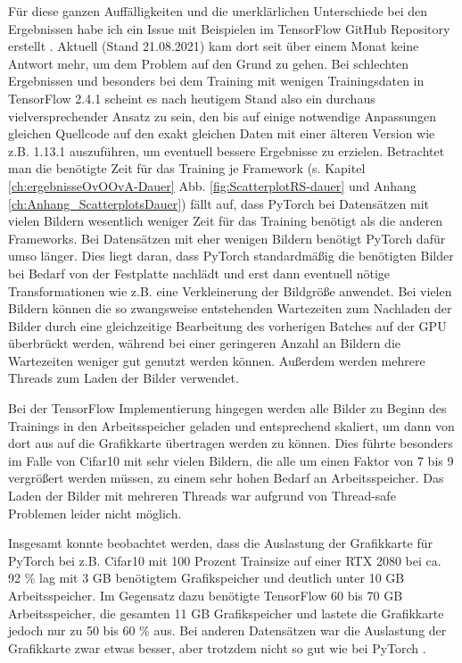 Für diese ganzen Auffälligkeiten und die unerklärlichen Unterschiede bei den Ergebnissen habe ich ein Issue mit Beispielen im TensorFlow GitHub Repository erstellt \cite{githubTFIssue}. Aktuell (Stand 21.08.2021) kam dort seit über einem Monat keine Antwort mehr, um dem Problem auf den Grund zu gehen.
Bei schlechten Ergebnissen und besonders bei dem Training mit wenigen Trainingsdaten in TensorFlow 2.4.1 \cite{tensorflow} scheint es nach heutigem Stand also ein durchaus vielversprechender Ansatz zu sein, den bis auf einige notwendige Anpassungen gleichen Quellcode auf den exakt gleichen Daten mit einer älteren Version wie z.B. 1.13.1 auszuführen, um eventuell bessere Ergebnisse zu erzielen.
\newpage
Betrachtet man die benötigte Zeit für das Training je Framework (s. Kapitel \ref{ch:ergebnisseOvOOvA-Dauer} Abb. \ref{fig:ScatterplotRS-dauer} und Anhang \ref{ch:Anhang_ScatterplotsDauer}) fällt auf, dass PyTorch \cite{pytorch} bei Datensätzen mit vielen Bildern wesentlich weniger Zeit für das Training benötigt als die anderen Frameworks. Bei Datensätzen mit eher wenigen Bildern benötigt PyTorch \cite{pytorch} dafür umso länger. Dies liegt daran, dass PyTorch \cite{pytorch} standardmäßig die benötigten Bilder bei Bedarf von der Festplatte nachlädt und erst dann eventuell nötige Transformationen wie z.B. eine Verkleinerung der Bildgröße anwendet. Bei vielen Bildern können die so zwangsweise entstehenden Wartezeiten zum Nachladen der Bilder durch eine gleichzeitige Bearbeitung des vorherigen Batches auf der GPU überbrückt werden, während bei einer geringeren Anzahl an Bildern die Wartezeiten weniger gut genutzt werden können. Außerdem werden mehrere Threads zum Laden der Bilder verwendet.


Bei der TensorFlow \cite{tensorflow} Implementierung hingegen werden alle Bilder zu Beginn des Trainings in den Arbeitsspeicher geladen und entsprechend skaliert, um dann von dort aus auf die Grafikkarte übertragen werden zu können. Dies führte besonders im Falle von Cifar10 \cite{cifar10} mit sehr vielen Bildern, die alle um einen Faktor von 7 bis 9 vergrößert werden müssen, zu einem sehr hohen Bedarf an Arbeitsspeicher. Das Laden der Bilder mit mehreren Threads war aufgrund von Thread-safe Problemen leider nicht möglich.


Insgesamt konnte beobachtet werden, dass die Auslastung der Grafikkarte für PyTorch \cite{pytorch} bei z.B. Cifar10 mit 100 Prozent Trainsize auf einer RTX 2080 bei ca. 92 \% lag mit 3 GB benötigtem Grafikspeicher und deutlich unter 10 GB Arbeitsspeicher. Im Gegensatz dazu benötigte TensorFlow \cite{tensorflow} 60 bis 70 GB Arbeitsspeicher, die gesamten 11 GB Grafikspeicher und lastete die Grafikkarte jedoch nur zu 50 bis 60 \% aus.
Bei anderen Datensätzen war die Auslastung der Grafikkarte zwar etwas besser, aber trotzdem nicht so gut wie bei PyTorch \cite{pytorch}.


